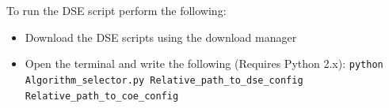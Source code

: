 To run the DSE script perform the following:
\begin{itemize}
  \item Download the DSE scripts using the download manager
  \item Open the terminal and write the following (Requires Python 2.x): \texttt{python Algorithm\_selector.py Relative\_path\_to\_dse\_config Relative\_path\_to\_coe\_config}
\end{itemize}
